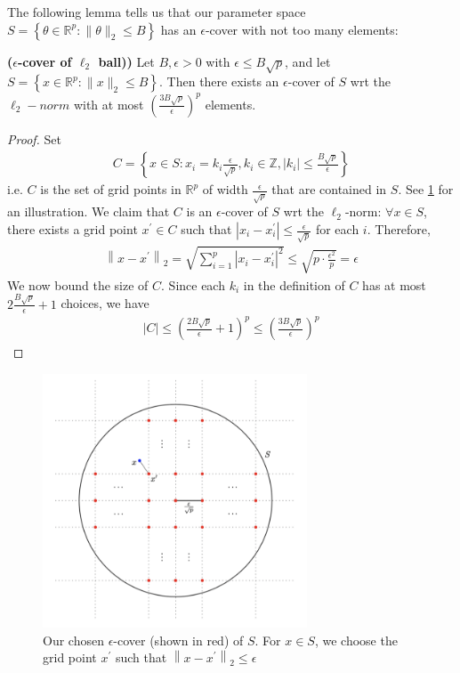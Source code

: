 \documentclass{article}
\newcommand{\bfs}[1]{\textbf{({#1}) }}
\begin{document}
The following lemma tells us that our parameter space $S=\left\{\theta \in \mathbb{R}^{p}:\|\theta\|_{2} \leq B\right\}$ has an $\epsilon$-cover with not too many elements:

\begin{lema}\bfs{$\epsilon$-cover of $\ell_{2}$ ball)} \label{lem:cover}Let $B, \epsilon>0$ with $\epsilon \leq B \sqrt{p}$, and let $S=\left\{x \in \mathbb{R}^{p}:\|x\|_{2} \leq B\right\} .$ Then there exists an $\epsilon$-cover of $S$ \gls{wrt} the $\ell_{2}-n o r m$ with at most $\left(\frac{3 B \sqrt{p}}{\epsilon}\right)^{p}$ elements.
\end{lema}
\begin{proof}
  Set
\begin{align*}
C=\left\{x \in S: x_{i}=k_{i} \frac{\epsilon}{\sqrt{p}}, k_{i} \in \mathbb{Z},\left|k_{i}\right| \leq \frac{B \sqrt{p}}{\epsilon}\right\}
\end{align*}
i.e. $C$ is the set of grid points in $\mathbb{R}^{p}$ of width $\frac{\epsilon}{\sqrt{p}}$ that are contained in $S .$ See \cref{fig:cover} for an illustration.
We claim that $C$ is an $\epsilon$-cover of $S$ \gls{wrt} the $\ell_{2}$-norm: $\forall x \in S$, there exists a grid point $x^{\prime} \in C$ such that $\left|x_{i}-x_{i}^{\prime}\right| \leq \frac{\epsilon}{\sqrt{p}}$ for each $i .$ Therefore,
\begin{align*}
\left\|x-x^{\prime}\right\|_{2}=\sqrt{\sum_{i=1}^{p}\left|x_{i}-x_{i}^{\prime}\right|^{2}} \leq \sqrt{p \cdot \frac{\epsilon^{2}}{p}}=\epsilon
\end{align*}
We now bound the size of $C .$ Since each $k_{i}$ in the definition of $C$ has at most $2 \frac{B \sqrt{p}}{\epsilon}+1$ choices, we have
\begin{align*}
|C| \leq\left(\frac{2 B \sqrt{p}}{\epsilon}+1\right)^{p} \leq\left(\frac{3 B \sqrt{p}}{\epsilon}\right)^{p}
\end{align*}
\end{proof}
\begin{figure}
    \centering
    \includegraphics[width=0.7\textwidth]{Figs/3.png}
    \caption{Our chosen $\epsilon$-cover (shown in red) of $S .$ For $x \in S$, we choose the grid point $x^{\prime}$ such that $\left\|x-x^{\prime}\right\|_{2} \leq \epsilon$}
    \label{fig:cover}
\end{figure}
\end{document}
